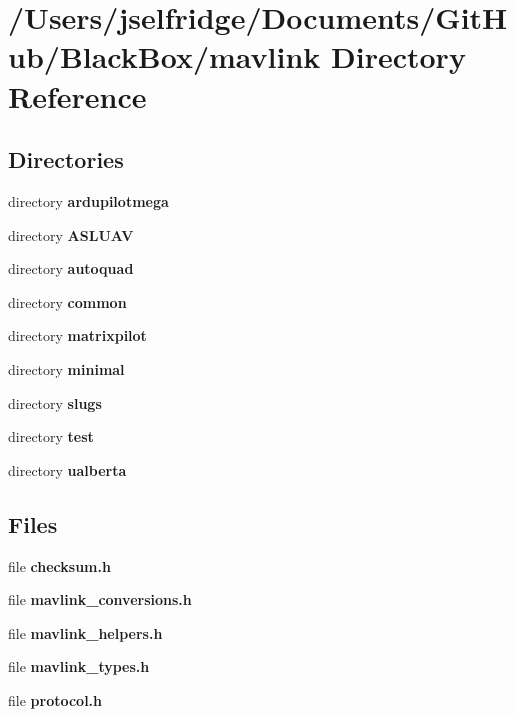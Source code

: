 \section{/\+Users/jselfridge/\+Documents/\+Git\+Hub/\+Black\+Box/mavlink Directory Reference}
\label{dir_16569919ec711c6f36c173783b4257b7}
\subsection*{Directories}
\begin{DoxyCompactItemize}
\item 
directory \textbf{ ardupilotmega}
\item 
directory \textbf{ A\+S\+L\+U\+AV}
\item 
directory \textbf{ autoquad}
\item 
directory \textbf{ common}
\item 
directory \textbf{ matrixpilot}
\item 
directory \textbf{ minimal}
\item 
directory \textbf{ slugs}
\item 
directory \textbf{ test}
\item 
directory \textbf{ ualberta}
\end{DoxyCompactItemize}
\subsection*{Files}
\begin{DoxyCompactItemize}
\item 
file \textbf{ checksum.\+h}
\item 
file \textbf{ mavlink\+\_\+conversions.\+h}
\item 
file \textbf{ mavlink\+\_\+helpers.\+h}
\item 
file \textbf{ mavlink\+\_\+types.\+h}
\item 
file \textbf{ protocol.\+h}
\end{DoxyCompactItemize}
